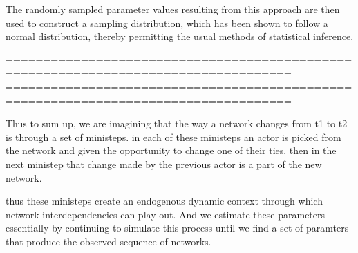 The randomly sampled parameter values resulting from this approach are then used to construct a sampling distribution, which has been shown to follow a normal distribution, thereby permitting the usual methods of statistical inference.



====================================================================================
====================================================================================

Thus to sum up, we are imagining that the way a network changes from t1 to t2 is through a set of ministeps. in each of these ministeps an actor is picked from the network and given the opportunity to change one of their ties. then in the next ministep that change made by the previous actor is a part of the new network. 

thus these ministeps create an endogenous dynamic context through which network interdependencies can play out. And we estimate these parameters essentially by continuing to simulate this process until we find a set of paramters that produce the observed sequence of networks.
